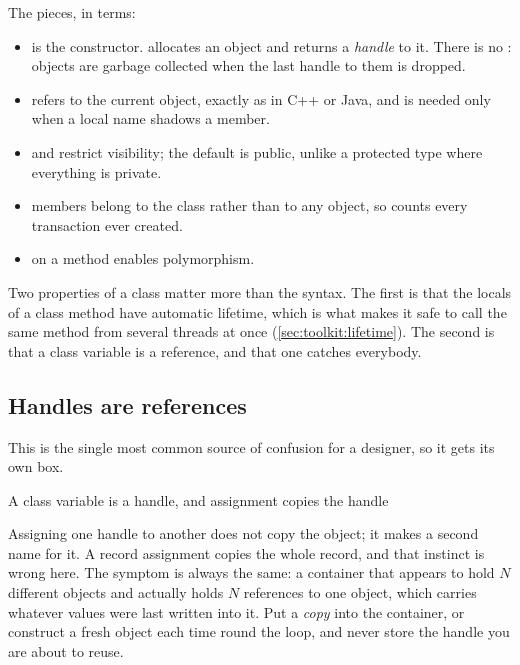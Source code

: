 The pieces, in \VHDL{} terms:

\begin{itemize}
  \item {} is the constructor.  allocates
        an object and returns a \emph{handle} to it. There is no
        : objects are garbage collected when the last handle
        to them is dropped.
  \item {} refers to the current object, exactly as in C++ or Java,
        and is needed only when a local name shadows a member.
  \item {} and  restrict visibility; the default is
        public, unlike a protected type where everything is private.
  \item {} members belong to the class rather than to any object, so
         counts every transaction ever created.
  \item {} on a method enables polymorphism.
\end{itemize}

Two properties of a class matter more than the syntax. The first is that the
locals of a class method have automatic lifetime, which is what makes it safe
to call the same method from several threads at once
(\cref{sec:toolkit:lifetime}). The second is that a class variable is a
reference, and that one catches everybody.

\subsection{Handles are references}

This is the single most common source of confusion for a \VHDL{} designer, so
it gets its own box.

\begin{gotcha}{A class variable is a handle, and assignment copies the handle}
Assigning one handle to another does not copy the object; it makes a second
name for it. A \VHDL{} record assignment copies the whole record, and that
instinct is wrong here. The symptom is always the same: a container that
appears to hold $N$ different objects and actually holds $N$ references to one
object, which carries whatever values were last written into it. Put a
\emph{copy} into the container, or construct a fresh object each time round
the loop, and never store the handle you are about to reuse.
\end{gotcha}

